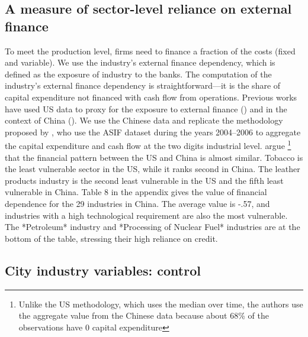 \documentclass[12pt]{article}
\begin{document}
\subsection{A measure of sector-level reliance on external finance} \label{sec:fin}

To meet the production level, firms need to finance a fraction of the costs (fixed and variable). We use the industry’s external finance dependency, which is defined as the exposure of industry to the banks. The computation of the industry’s external finance dependency is straightforward—it is the share of capital expenditure not financed with cash flow from operations. Previous works have used US data to proxy for the exposure to external finance (\cite{Rajan1998-tn, Claessens2002-mj, Kroszner2007-gt}) and in the context of China (\cite{Jarreau2014-lb, Manova2015-zk, Fan2015-bm}). We use the Chinese data and replicate the methodology proposed by \cite{Fan2015-bm}, who use the ASIF dataset during the years 2004–2006 to aggregate the capital expenditure and cash flow at the two digits industrial level. \cite{Fan2015-bm} argue \footnote{Unlike the US methodology, which uses the median over time, the authors use the aggregate value from the Chinese data because about 68\% of the observations have 0 capital expenditure} that the financial pattern between the US and China is almost similar. Tobacco is the least vulnerable sector in the US, while it ranks second in China. The leather products industry is the second least vulnerable in the US and the fifth least vulnerable in China. Table 8 in the appendix gives the value of financial dependence for the 29 industries in China. The average value is -.57, and industries with a high technological requirement are also the most vulnerable. The *Petroleum* industry and *Processing of Nuclear Fuel* industries are at the bottom of the table, stressing their high reliance on credit.

\subsection{City industry variables: control} \label{sec:control}
\end{document}
